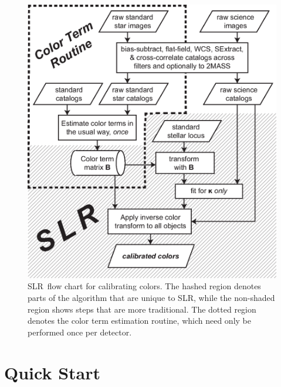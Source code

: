 \documentclass{report}
\newcommand{\slr}{SLR}
\begin{document}
\begin{figure}
\center
\includegraphics[scale=0.9]{fig/slr_algorithm.eps}
\caption{ \slr\ flow chart for calibrating colors.  The hashed region
  denotes parts of the algorithm that are unique to \slr, while the
  non-shaded region shows steps that are more traditional.  The dotted
  region denotes the color term estimation routine, which need only be
  performed once per detector. }
\label{fig:algorithm}
\end{figure}


\chapter{Quick Start}
\end{document}
